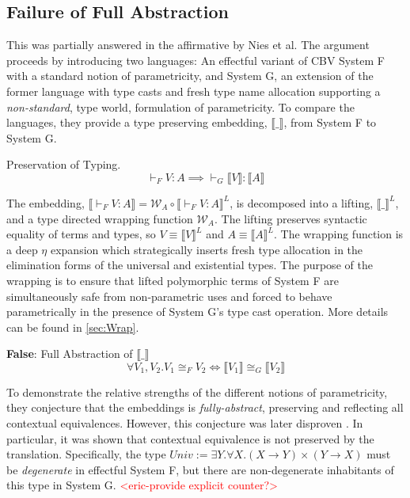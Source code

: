 \documentclass[acmsmall]{acmart}
\newcommand{\den}[1]{\llbracket #1\rrbracket}
\newcommand{\eric}[1]{\textcolor{red}{ <eric-#1> }}
\begin{document}
\subsection{Failure of Full Abstraction}
This was partially answered in the affirmative by Nies et al\cite{NonParam}. The argument proceeds by introducing two languages: An effectful variant of CBV System F with a standard notion of parametricity, and System G, an extension of the former language with type casts and fresh type name allocation supporting a \textit{non-standard}, type world, formulation of parametricity.
To compare the languages, they provide a type preserving embedding, $\den{\_}$, from System F to System G. 

\begin{theorem}
  Preservation of Typing.
  $$\vdash_F V : A \implies \vdash_G \den{V} : \den{A}$$
\end{theorem}

The embedding, $\den{\vdash_F V:A} = \mathcal{W}_{A} \circ \den{\vdash_F V:A}^L$, is decomposed into a lifting, $\den{\_}^L$, and a type directed wrapping function $\mathcal{W}_A$. The lifting preserves syntactic equality of terms and types, so $V \equiv \den{V}^L$ and $A \equiv \den{A}^L$. The wrapping function is a deep $\eta$ expansion which strategically inserts fresh type allocation in the elimination forms of the universal and existential types. The purpose of the wrapping is to ensure that lifted polymorphic terms of System F are simultaneously safe from non-parametric uses and forced to behave parametrically in the presence of System G's type cast operation. More details can be found in \cref{sec:Wrap}. 

\begin{conjecture}
  \textbf{False}: Full Abstraction of $\den{\_}$
  $$\forall V_1,V_2. V_1\cong_F V_2 \iff \den{V_1} \cong_G \den{V_2}$$
\end{conjecture}

To demonstrate the relative strengths of the different notions of parametricity, they conjecture that the embeddings is \textit{fully-abstract}, preserving and reflecting all contextual equivalences. However, this conjecture was later disproven\cite{ParamVSUniv} \cite{TwoParamVSThreeUniv}. In particular, it was shown that contextual equivalence is not preserved by the translation. Specifically, the type $Univ := \exists Y.\forall X. (X\rightarrow Y)\times (Y \rightarrow X)$ must be \textit{degenerate} in effectful System F, but there are non-degenerate inhabitants of this type in System G. \eric{provide explicit counter?}
\end{document}
